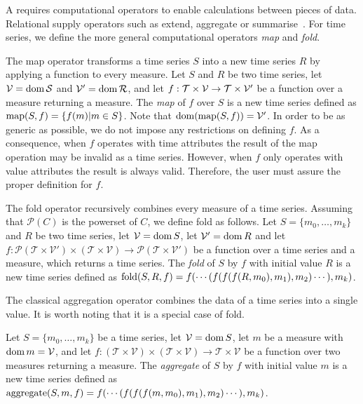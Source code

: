 A  requires computational operators to enable calculations
between pieces of data. Relational  supply operators such
as extend, aggregate or summarise~\cite{date:introduction}. For time
series, we define the more general computational operators \emph{map}
and \emph{fold}.

The map operator transforms a time series $S$ into a new time series
$R$ by applying a function to every measure.  Let $S$ and $R$ be two
time series, let $\cal{V}=\operatorname{dom} S$ and $\cal{V'}=\operatorname{dom} R$, and let
$f:\cal{T}\times\cal{V}\rightarrow\cal{T}\times\cal{V'}$ be a function
over a measure returning a measure. The \emph{map} of $f$ over $S$ is
a new time series defined as $\operatorname*{map}(S,f)=\{f(m)|m\in S\}$. Note that
$\operatorname{dom}(\operatorname*{map}(S,f))=\cal{V'}$. 
In order to be as generic as possible, we do not impose any
restrictions on defining $f$. As a consequence, when $f$ operates with
time attributes the result of the map operation may be invalid as a
time series. However, when $f$ only operates with value attributes the
result is always valid. Therefore, the user must assure the proper
definition for $f$.



The fold operator recursively combines every measure of a time
series. Assuming that $\mathcal{P}(C)$ is the powerset of $C$, we
define fold as follows.
%
Let $S=\{m_0,\dots, m_k\}$ and $R$ be two time series, let
$\mathcal{V}=\operatorname{dom} S$, let $\mathcal{V'}=\operatorname{dom} R$ and let
%
$f:\mathcal{P}(\mathcal{T}\times\mathcal{V'}) \times (\mathcal{T}\times\mathcal{V}) \rightarrow \mathcal{P}(\mathcal{T}\times\mathcal{V'})$ 
%
be a function over a time series and a measure, which returns a time
series.
%
The \emph{fold} of $S$ by $f$ with initial value $R$ is a new time
series defined as $\operatorname*{fold}(S,R,f) = f(\cdots(f(f(f(R,m_0),\allowbreak
m_1),\allowbreak m_2)\cdots),\allowbreak m_k)$.
%

The classical aggregation operator combines the data of a time series
into a single value.  It is worth noting that it is a special case of
fold.

Let $S=\{m_0,\dots,m_k\}$ be a time series, let $\mathcal{V}=\operatorname{dom} S$,
let $m$ be a measure with $\operatorname{dom} m=\mathcal{V}$, and let
%
$f:(\mathcal{T}\times\mathcal{V})\times(\mathcal{T}\times\mathcal{V})\rightarrow
\mathcal{T}\times\mathcal{V}$ be a function over two measures
returning a measure. The \emph{aggregate} of $S$ by $f$ with initial
value $m$ is a new time series defined as $\operatorname*{aggregate}(S,m,f) =
f(\cdots(f(f(f(m,m_0),\allowbreak m_1),\allowbreak
m_2)\cdots),\allowbreak m_k)$.


